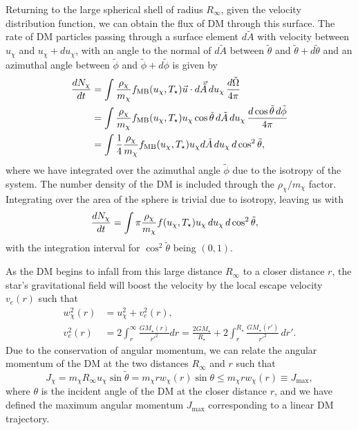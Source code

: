 Returning to the large spherical shell of radius $R_\infty$, given the velocity distribution function, we can obtain the flux of DM through this surface. The rate of DM particles passing through a surface element $d\tilde{A}$ with velocity between $u_\chi$ and $u_\chi + du_\chi$, with an angle to the normal of $d\tilde{A}$ between $\tilde\theta$ and $\tilde \theta + d\tilde \theta$ and an azimuthal angle between $\tilde \phi$ and $\tilde \phi + d\tilde \phi$ is given by~\cite{Press:1985ug_Capturesungalactic}
\begin{align}
    \frac{dN_\chi}{dt} &= \int\frac{\rho_\chi}{m_\chi}f_{\mathrm{MB}}(u_\chi, T_\star) \vec{u}\cdot d\vec{\tilde{A}}\, d u_\chi\, \frac{d\tilde \Omega}{4\pi}\\
    & = \int\frac{\rho_\chi}{m_\chi}f_{\rm MB}(u_\chi, T_\star)u_\chi \cos\tilde\theta \,d\tilde{A}\, d u_\chi\,  \frac{d\cos\tilde\theta \,d\tilde\phi}{4\pi}\\
    & = \int\frac{1}{4}\frac{\rho_\chi}{m_\chi}f_{\rm MB}(u_\chi, T_\star)u_\chi d\tilde{A}\, d u_\chi\,d\cos^2\tilde\theta,
\end{align}
where we have integrated over the azimuthal angle $\tilde \phi$ due to the isotropy of the system. The number density of the DM is included through the $\rho_\chi/m_\chi$ factor. 
Integrating over the area of the sphere is trivial due to isotropy, leaving us with 
\begin{align}
    \frac{dN_\chi}{dt} &= \int \pi \frac{\rho_\chi}{m_\chi} f(u_\chi, T_\star)u_\chi\, d u_\chi \, d\cos^2\tilde\theta,
\end{align}
with the integration interval for $\cos^2\tilde\theta$ being $(0, 1)$.

As the DM begins to infall from this large distance $R_\infty$ to a closer distance $r$, the star's gravitational field will boost the velocity by the local escape velocity $v_e(r)$ such that
\begin{align}
    w^2_\chi(r) &= u^2_\chi + v_e^2(r),\\
    v_e^2(r) & = 2\int_r^\infty \frac{G M_\star(r)}{r'^2}dr =  \frac{2 G M_\star}{R_\star} + 2\int_r^{R_\star} \frac{G M_\star(r')}{r'^2}\,dr'.
\end{align}
Due to the conservation of angular momentum, we can relate the angular momentum of the DM at the two distances $R_\infty$ and $r$ such that
\begin{equation}
    J_\chi = m_\chi R_\infty u_\chi \sin \tilde\theta = m_\chi r w_\chi(r) \sin\theta \leq m_\chi r w_\chi(r) \equiv J_{\mathrm{max}},
\end{equation}
where $\theta$ is the incident angle of the DM at the closer distance $r$, and we have defined the maximum angular momentum $J_{\mathrm{max}}$ corresponding to a linear DM trajectory.

